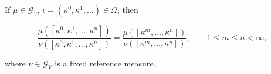 If $\mu \in \mathcal{G}_V$, $\iota = (\kappa^0, \kappa^1, \ldots) \in \Omega$, then

$$
\frac{\mu([\kappa^0, \kappa^1, \ldots, \kappa^n])}{\nu([\kappa^0, \kappa^1, \ldots, \kappa^n])}
= \frac{\mu([\kappa^m, \ldots, \kappa^n])}{\nu([\kappa^m, \ldots, \kappa^n])},
\qquad 1 \leq m \leq n < \infty,
$$

where $\nu \in \mathcal{G}_V$ is a fixed reference measure.
